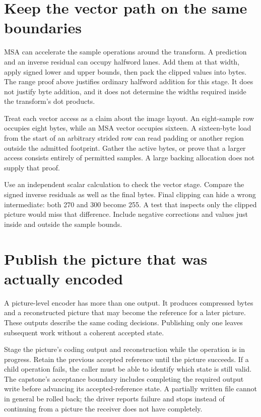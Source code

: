 \section{Keep the vector path on the same boundaries}

MSA can accelerate the sample operations around the transform. A prediction and
an inverse residual can occupy halfword lanes. Add them at that width, apply
signed lower and upper bounds, then pack the clipped values into bytes. The
range proof above justifies ordinary halfword addition for this stage. It does
not justify byte addition, and it does not determine the widths required inside
the transform's dot products.

Treat each vector access as a claim about the image layout. An eight-sample row
occupies eight bytes, while an MSA vector occupies sixteen. A sixteen-byte load
from the start of an arbitrary strided row can read padding or another region
outside the admitted footprint. Gather the active bytes, or prove that a larger
access consists entirely of permitted samples. A large backing allocation does
not supply that proof.

Use an independent scalar calculation to check the vector stage. Compare the
signed inverse residuals as well as the final bytes. Final clipping can hide a
wrong intermediate: both 270 and 300 become 255. A test that inspects only the
clipped picture would miss that difference. Include negative corrections and
values just inside and outside the sample bounds.

\section{Publish the picture that was actually encoded}

A picture-level encoder has more than one output. It produces compressed bytes
and a reconstructed picture that may become the reference for a later picture.
These outputs describe the same coding decisions. Publishing only one leaves
subsequent work without a coherent accepted state.

Stage the picture's coding output and reconstruction while the operation is in
progress. Retain the previous accepted reference until the picture succeeds.
If a child operation fails, the caller must be able to identify which state is
still valid. The capstone's acceptance boundary includes completing the required
output write before advancing its accepted-reference state. A partially written
file cannot in general be rolled back; the driver reports failure and stops
instead of continuing from a picture the receiver does not have completely.

